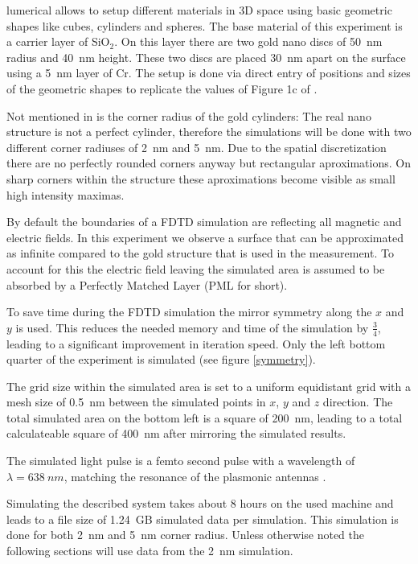 lumerical allows to setup different materials in 3D space using basic geometric shapes like cubes, cylinders and spheres. The base material of this experiment is a carrier layer of SiO$_2$. On this layer there are two gold nano discs of \SI{50}{nm} radius and \SI{40}{nm} height. These two discs are placed \SI{30}{nm} apart on the surface using a \SI{5}{nm} layer of Cr. The setup is done via direct entry of positions and sizes of the geometric shapes to replicate the values of Figure 1c of \cite{heeg}.

Not mentioned in \cite{heeg} is the corner radius of the gold cylinders: The real nano structure is not a perfect cylinder, therefore the simulations will be done with two different corner radiuses of \SI{2}{nm} and \SI{5}{nm}. Due to the spatial discretization there are no perfectly rounded corners anyway but rectangular aproximations. On sharp corners within the structure these aproximations become visible as small high intensity maximas.

By default the boundaries of a FDTD simulation are reflecting all magnetic and electric fields. In this experiment we observe a surface that can be approximated as infinite compared to the gold structure that is used in the measurement. To account for this the electric field leaving the simulated area is assumed to be absorbed by a Perfectly Matched Layer (PML for short).

To save time during the FDTD simulation the mirror symmetry along the $x$ and $y$ is used. This reduces the needed memory and time of the simulation by $\frac{3}{4}$, leading to a significant improvement in iteration speed. Only the left bottom quarter of the experiment is simulated (see figure \ref{symmetry}).

The grid size within the simulated area is set to a uniform equidistant grid with a mesh size of \SI{0.5}{nm} between the simulated points in $x$, $y$ and $z$ direction. The total simulated area on the bottom left is a square of \SI{200}{nm}, leading to a total calculateable square of \SI{400}{nm} after mirroring the simulated results.

The simulated light pulse is a femto second pulse with a wavelength of $\lambda=\SI{638}{nm}$, matching the resonance of the plasmonic antennas \cite{heet}.

Simulating the described system takes about 8 hours on the used machine and leads to a file size of \SI{1.24}{GB} simulated data per simulation. This simulation is done for both \SI{2}{nm} and \SI{5}{nm} corner radius. Unless otherwise noted the following sections will use data from the \SI{2}{nm} simulation.

